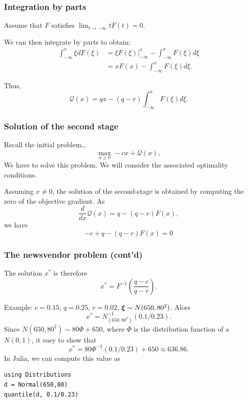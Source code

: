 \documentclass{beamer}
\begin{document}
\begin{frame}
\frametitle{Integration by parts}

Assume that $F$ satisfies $\lim_{t \rightarrow -\infty}
tF(t) = 0$.

\mbox{}

We can then integrate by parts to obtain:
\begin{align*}
\int_{-\infty}^x \xi dF(\xi) &= \xi F(\xi) |_{-\infty}^x -
\int_{-\infty}^x F(\xi) d\xi \\
&=  xF(x) - \int_{-\infty}^x F(\xi) d\xi.
\end{align*}

Thus,
\[
\mathcal{Q}(x) = qx - (q - r)\int_{-\infty}^x F(\xi)d\xi.
\]

\end{frame}

\begin{frame}
\frametitle{Solution of the second stage}

Recall the initial problem\ldots
\[
\max_{x \geq 0} -cx + \mathcal{Q}(x),
\]
We have to solve this problem.
We will consider the associated optimality conditions.

\mbox{}

Assuming $x \ne 0$, the solution of the second-stage is obtained by computing the zero of the objective gradient.
As
\[
\frac{d}{dx} \mathcal{Q}(x) = q - (q - r)F(x),
\]
we have
\[
-c + q - (q - r)F(x) = 0
\]

\end{frame}

\begin{frame}[fragile]
\frametitle{The newsvendor problem (cont'd)}

The solution $x^*$ is therefore
\[
x^* = F^{-1} \left( \frac{q-c}{q-r} \right).
\]

\mbox{}

Example: $c = 0.15$, $q = 0.25$, $r = 0.02$, ${\boldsymbol{\xi}} \sim N(650, 80^2)$. Alors
\[
x^* = N^{-1}_{(650,80^2)}(0.1/0.23).
\]
Since $N(650, 80^2) \sim 80\Phi+650$, where $\Phi$ is the distribution function of a $N(0,1)$, it easy to show that
\[
x^* = 80\Phi^{-1}(0.1/0.23) + 650 \approx 636.86.
\]
In Julia, we can compute this value as
\begin{verbatim}
using Distributions
d = Normal(650,80)
quantile(d, 0.1/0.23)
\end{verbatim}


\end{frame}
\end{document}
